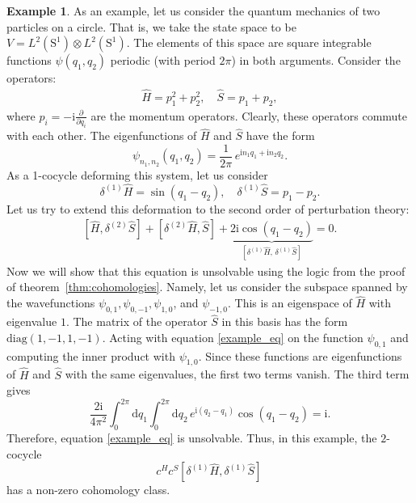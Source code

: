 \documentclass[10pt,a4paper]{amsart}
\theoremstyle{definition}
\newtheorem{example}[remark]{Example}
\begin{document}
\begin{example}
    As an example, let us consider the quantum mechanics of two particles on a circle. That is, we take the state space to be $V = L^2(\mathrm{S}^1) \otimes L^2(\mathrm{S}^1)$. The elements of this space are square integrable functions $\psi(q_{1},q_{2})$ periodic (with period $2\pi$) in both arguments. Consider the operators:
    \begin{equation}
    \begin{aligned}
        \hat{H}=p_{1}^{2}+p^{2}_{2},\quad \hat{S}=p_{1}+p_{2},
    \end{aligned}
    \end{equation}
    where $p_{i}=-\mathrm{i}\frac{\partial}{\partial q_{i}}$ are the momentum operators. Clearly, these operators commute with each other. The eigenfunctions of $\hat{H}$ and $\hat{S}$ have the form
    \begin{equation}
        \psi_{n_{1},n_{2}}(q_{1},q_{2})=\frac{1}{2\pi}\,e^{\mathrm{i}n_{1}q_{1}+\mathrm{i}n_{2}q_{2}}.
    \end{equation}
    As a 1-cocycle deforming this system, let us consider
    \begin{equation}
        \delta^{(1)}\hat{H}=\sin(q_{1}-q_{2}),\quad \delta^{(1)}\hat{S}=p_{1}-p_{2}.
    \end{equation}
    Let us try to extend this deformation to the second order of perturbation theory:
    \begin{equation}
    \begin{aligned}
    \label{example_eq}
        [\hat{H},\delta^{(2)}\hat{S}]+[\delta^{(2)}\hat{H},\hat{S}]+\underbrace{2\mathrm{i}\cos(q_{1}-q_{2})}_{[\delta^{(1)}\hat{H},\,\delta^{(1)}\hat{S}]}=0.
    \end{aligned}
    \end{equation}
    Now we will show that this equation is unsolvable using the logic from the proof of theorem~\ref{thm:cohomologies}. Namely, let us consider the subspace spanned by the wavefunctions $\psi_{0,1}, \psi_{0,-1}, \psi_{1,0}$, and $\psi_{-1,0}$. This is an eigenspace of $\hat{H}$ with eigenvalue $1$. The matrix of the operator $\hat{S}$ in this basis has the form $\mathrm{diag}(1,-1,1,-1)$. Acting with equation \eqref{example_eq} on the function $\psi_{0,1}$ and computing the inner product with $\psi_{1,0}$. Since these functions are eigenfunctions of $\hat{H}$ and $\hat{S}$ with the same eigenvalues, the first two terms vanish. The third term gives
    \begin{equation}
        \frac{2\mathrm{i}}{4\pi^{2}}\int_{0}^{2\pi}\mathrm{d}q_{1}\int_{0}^{2\pi}\mathrm{d}q_{2}\,e^{\mathrm{i}(q_{2}-q_{1})}\cos(q_{1}-q_{2})=\mathrm{i}.
    \end{equation}
    Therefore, equation \eqref{example_eq} is unsolvable. Thus, in this example, the $2$-cocycle
    \begin{equation}
        c^{H}c^{S}[\delta^{(1)}\hat{H},\delta^{(1)}\hat{S}]\,
    \end{equation}
    has a non-zero cohomology class.
\end{example}
\end{document}

